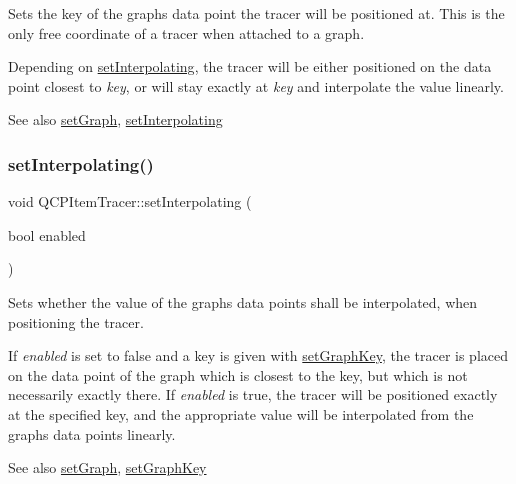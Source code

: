 Sets the key of the graph\textquotesingle{}s data point the tracer will be positioned at. This is the only free coordinate of a tracer when attached to a graph.

Depending on \mbox{\hyperlink{class_q_c_p_item_tracer_a6c244a9d1175bef12b50afafd4f5fcd2}{set\+Interpolating}}, the tracer will be either positioned on the data point closest to {\itshape key}, or will stay exactly at {\itshape key} and interpolate the value linearly.

\begin{DoxySeeAlso}{See also}
\mbox{\hyperlink{class_q_c_p_item_tracer_af5886f4ded8dd68cb4f3388f390790c0}{set\+Graph}}, \mbox{\hyperlink{class_q_c_p_item_tracer_a6c244a9d1175bef12b50afafd4f5fcd2}{set\+Interpolating}} 
\end{DoxySeeAlso}
\mbox{\label{class_q_c_p_item_tracer_a6c244a9d1175bef12b50afafd4f5fcd2}} 
\subsubsection{\texorpdfstring{setInterpolating()}{setInterpolating()}}
{\footnotesize\ttfamily void Q\+C\+P\+Item\+Tracer\+::set\+Interpolating (\begin{DoxyParamCaption}\item[{bool}]{enabled }\end{DoxyParamCaption})}

Sets whether the value of the graph\textquotesingle{}s data points shall be interpolated, when positioning the tracer.

If {\itshape enabled} is set to false and a key is given with \mbox{\hyperlink{class_q_c_p_item_tracer_a6840143b42f3b685cedf7c6d83a704c8}{set\+Graph\+Key}}, the tracer is placed on the data point of the graph which is closest to the key, but which is not necessarily exactly there. If {\itshape enabled} is true, the tracer will be positioned exactly at the specified key, and the appropriate value will be interpolated from the graph\textquotesingle{}s data points linearly.

\begin{DoxySeeAlso}{See also}
\mbox{\hyperlink{class_q_c_p_item_tracer_af5886f4ded8dd68cb4f3388f390790c0}{set\+Graph}}, \mbox{\hyperlink{class_q_c_p_item_tracer_a6840143b42f3b685cedf7c6d83a704c8}{set\+Graph\+Key}} 
\end{DoxySeeAlso}
\mbox{\label{class_q_c_p_item_tracer_af8048636fc1ef0152e51809b008df2ca}} 
